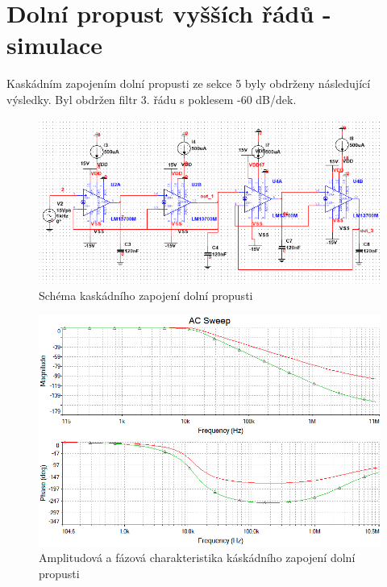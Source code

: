 \documentclass[twoside]{article}
\begin{document}
\section{Dolní propust vyšších řádů - simulace}
Kaskádním zapojením dolní propusti ze sekce 5 byly obdrženy následující výsledky. Byl obdržen filtr 3. řádu s poklesem -60 dB/dek.
\begin{figure}[H]
\centering
\includegraphics[scale=0.75]{kaskadneschema.png}
\caption{Schéma kaskádního zapojení dolní propusti}
\end{figure}
\begin{figure}[H]
\centering
\includegraphics[scale=0.75]{kaskadne1.png}
\caption{Amplitudová a fázová charakteristika káskádního zapojení dolní propusti}
\end{figure}
\end{document}
